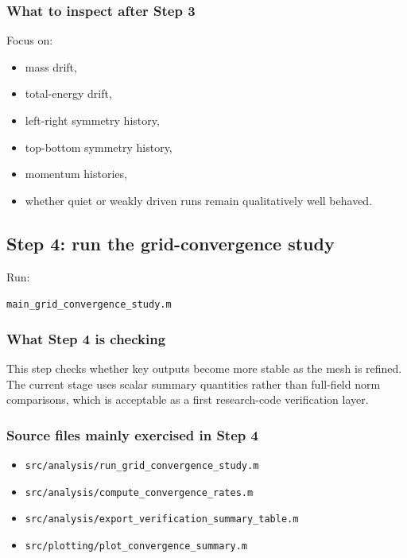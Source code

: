 \documentclass[11pt]{article}
\begin{document}
\subsubsection{What to inspect after Step 3}
Focus on:
\begin{itemize}[leftmargin=1.8em]
    \item mass drift,
    \item total-energy drift,
    \item left-right symmetry history,
    \item top-bottom symmetry history,
    \item momentum histories,
    \item whether quiet or weakly driven runs remain qualitatively well behaved.
\end{itemize}

\subsection{Step 4: run the grid-convergence study}
Run:
\begin{center}
\texttt{main\_grid\_convergence\_study.m}
\end{center}

\subsubsection{What Step 4 is checking}
This step checks whether key outputs become more stable as the mesh is refined. The current stage uses scalar summary quantities rather than full-field norm comparisons, which is acceptable as a first research-code verification layer.

\subsubsection{Source files mainly exercised in Step 4}
\begin{itemize}[leftmargin=1.8em]
    \item \texttt{src/analysis/run\_grid\_convergence\_study.m}
    \item \texttt{src/analysis/compute\_convergence\_rates.m}
    \item \texttt{src/analysis/export\_verification\_summary\_table.m}
    \item \texttt{src/plotting/plot\_convergence\_summary.m}
\end{itemize}
\end{document}
